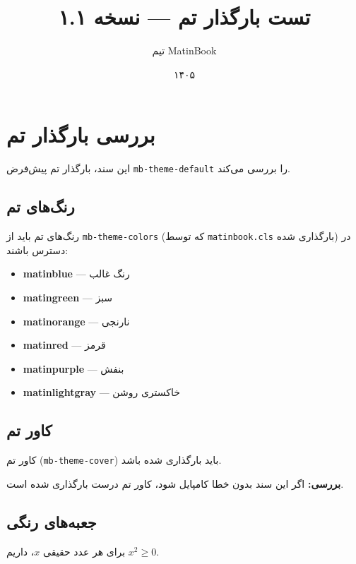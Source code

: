 \documentclass{matinbook}
\title{تست بارگذار تم — نسخه ۱.۱}
\author{تیم MatinBook}
\date{۱۴۰۵}
\begin{document}
\maketitle

\chapter{بررسی بارگذار تم}
\label{chap:test-theme-default}

این سند، بارگذار تم پیش‌فرض \texttt{mb-theme-default} را بررسی می‌کند.

\section{رنگ‌های تم}
\label{sec:theme-colors}

رنگ‌های تم باید از \texttt{mb-theme-colors} (که توسط \texttt{matinbook.cls} بارگذاری شده) در دسترس باشند:

\begin{itemize}
    \item \textcolor{matinblue}{\textbf{matinblue}} — رنگ غالب
    \item \textcolor{matingreen}{\textbf{matingreen}} — سبز
    \item \textcolor{matinorange}{\textbf{matinorange}} — نارنجی
    \item \textcolor{matinred}{\textbf{matinred}} — قرمز
    \item \textcolor{matinpurple}{\textbf{matinpurple}} — بنفش
    \item \textcolor{matinlightgray}{\textbf{matinlightgray}} — خاکستری روشن
\end{itemize}

\section{کاور تم}
\label{sec:theme-cover}

کاور تم (\texttt{mb-theme-cover}) باید بارگذاری شده باشد.

\textbf{بررسی:} اگر این سند بدون خطا کامپایل شود، کاور تم درست بارگذاری شده است.

\section{جعبه‌های رنگی}
\label{sec:colored-boxes}

\begin{theorem}
    برای هر عدد حقیقی $x$، داریم $x^2 \geq 0$.
\end{theorem}
\end{document}
